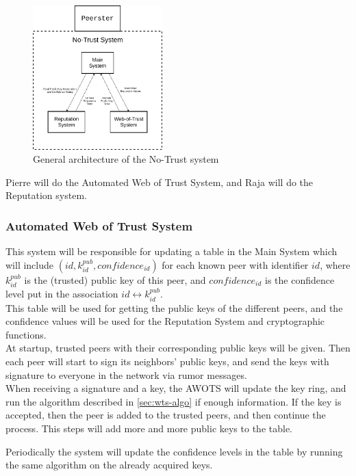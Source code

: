 \documentclass[]{article}
\begin{document}
\begin{figure}[h]
	\includegraphics[width=50mm]{no-trust-arch}
	\centering
	\caption{General architecture of the No-Trust system}
	\label{fig:no-trust-arch}
\end{figure}

\noindent
Pierre will do the Automated Web of Trust System, and Raja will do the Reputation system.

\subsubsection{Automated Web of Trust System}
This system will be responsible for updating a table in the Main System which will include $(id, k^{pub}_{id}, confidence_{id})$ for each known peer with identifier $id$, where $k^{pub}_{id}$ is the (trusted) public key of this peer, and $confidence_{id}$ is the confidence level put in the association $id \leftrightarrow k^{pub}_{id}$. \\
This table will be used for getting the public keys of the different peers, and the confidence values will be used for the Reputation System and cryptographic functions. \\

At startup, trusted peers with their corresponding public keys will be given. Then each peer will start to sign its neighbors' public keys, and send the keys with signature to everyone in the network via rumor messages. \\
When receiving a signature and a key, the AWOTS will update the key ring, and run the algorithm described in \ref{sec:wts-algo} if enough information. If the key is accepted, then the peer is added to the trusted peers, and then continue the process.
This steps will add more and more public keys to the table. 

Periodically the system will update the confidence levels in the table by running the same algorithm on the already acquired keys. \\
\end{document}
